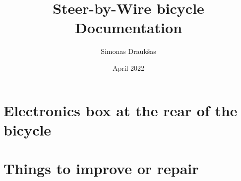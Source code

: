 \documentclass[12pt,a4paper]{report}
\title{Steer-by-Wire bicycle \\ Documentation}
\author{Simonas Draukšas}
\date{April 2022}
\begin{document}
\maketitle

\tableofcontents

\chapter{Electronics box at the rear of the bicycle}


\chapter{Things to improve or repair}

\end{document}
